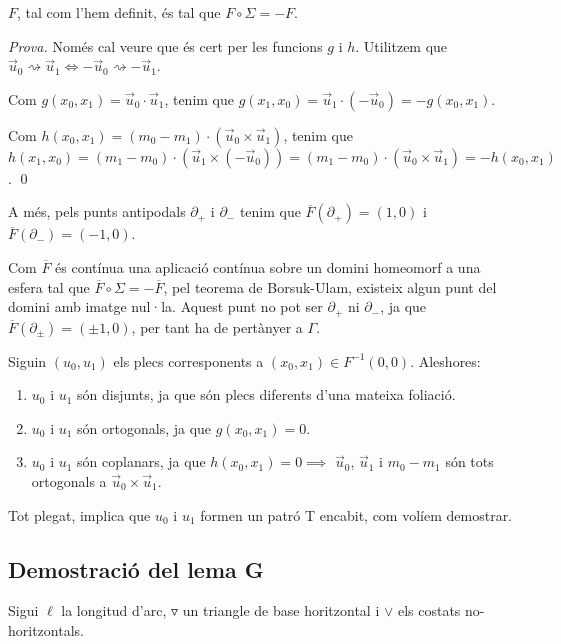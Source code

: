 \begin{prop}
    $F$, tal com l'hem definit, és tal que $F\circ\Sigma = -F$.
\end{prop}
{
    \color{black}
    \textit{Prova.}
    Només cal veure que és cert per les funcions $g$ i $h$. Utilitzem que $\vec u_0\rightsquigarrow\vec u_1\iff-\vec u_0\rightsquigarrow-\vec u_1$.

    Com $g(x_0,x_1) = \vec u_0\cdot\vec u_1$, tenim que $g(x_1,x_0) = \vec u_1 \cdot (-\vec u_0) = -g(x_0,x_1)$.

    Com $h(x_0,x_1) = (m_0- m_1)\cdot(\vec u_0\times\vec u_1)$, tenim que $h(x_1,x_0) = (m_1- m_0)\cdot(\vec u_1\times(-\vec u_0)) = (m_1- m_0)\cdot(\vec u_0\times\vec u_1) = -h(x_0,x_1)$.
    \qed
}

A més, pels punts antipodals $\partial_+$ i $\partial_-$ tenim que $\overline{F}(\partial_+) = (1,0)$ i $\overline{F}(\partial_-) = (-1,0)$.

Com $\overline{F}$ és contínua una aplicació contínua sobre un domini homeomorf a una esfera tal que $\overline{F}\circ\Sigma = -\overline{F}$, pel teorema de Borsuk-Ulam, existeix algun punt del domini amb imatge nul·la. Aquest punt no pot ser $\partial_+$ ni $\partial_-$, ja que $\overline{F}(\partial_\pm) = (\pm1,0)$, per tant ha de pertànyer a $\Gamma$.

Siguin $(u_0,u_1)$ els plecs corresponents a $(x_0,x_1)\in F^{-1}(0,0)$.
Aleshores:
\begin{enumerate}
    \item $u_0$ i $u_1$ són disjunts, ja que són plecs diferents d'una mateixa foliació.
    \item $u_0$ i $u_1$ són ortogonals, ja que $g(x_0,x_1) = 0$.
    \item $u_0$ i $u_1$ són coplanars, ja que $h(x_0,x_1) = 0\implies$ $\vec u_0$, $\vec u_1$ i $m_0-m_1$ són tots ortogonals a $\vec u_0\times\vec u_1$.
\end{enumerate}

Tot plegat, implica que $u_0$ i $u_1$ formen un patró T encabit, com volíem demostrar.

\subsection{Demostració del lema G}
\begin{nota}
    Sigui $\ell$ la longitud d'arc, $\triangledown$ un triangle de base horitzontal i $\lor$ els costats no-horitzontals.
\end{nota}


